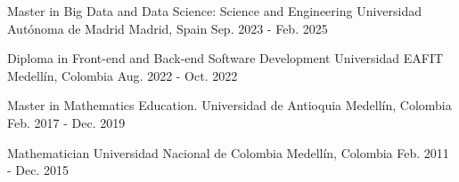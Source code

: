 \begin{cventries}


\cventry
{Master in Big Data and Data Science: Science and Engineering} %
{Universidad Autónoma de Madrid} %
{Madrid, Spain} %
{Sep. 2023 - Feb. 2025} %
{ %
}


\cventry
{Diploma in Front-end and Back-end Software Development} %
{Universidad EAFIT} %
{Medellín, Colombia} %
{Aug. 2022 - Oct. 2022} %
{ %
}



\cventry
{Master in Mathematics Education.} %
{Universidad de Antioquia} %
{Medellín, Colombia} %
{Feb. 2017 - Dec. 2019} %
{ %
}



\cventry
{Mathematician} %
{Universidad Nacional de Colombia} %
{Medellín, Colombia} %
{Feb. 2011 - Dec. 2015} %
{ %
}


\end{cventries}

